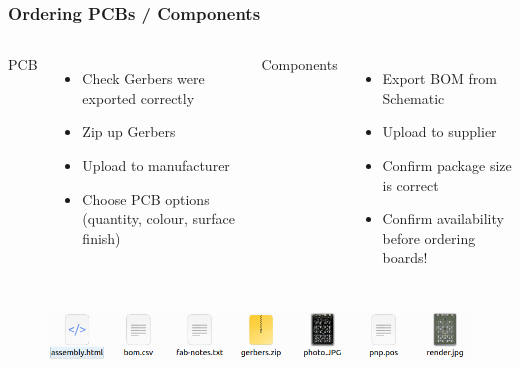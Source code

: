 \documentclass[aspectratio=169, t]{beamer}
\begin{document}
\begin{frame}
\frametitle{Ordering PCBs / Components}
\begin{columns}
	PCB
	\begin{itemize}
		\item Check Gerbers were exported correctly
		\item Zip up Gerbers
		\item Upload to manufacturer
		\item Choose PCB options (quantity, colour, surface finish)
	\end{itemize}
	
	Components
	\begin{itemize}
		\item Export BOM from Schematic
		\item Upload to supplier
		\item Confirm package size is correct
		\item Confirm availability before ordering boards!
	\end{itemize}
	
\end{columns}
\vspace{5mm}
\begin{figure}
	\includegraphics[width=\linewidth]{images/exported-files.png}
\end{figure}
\end{frame}
\end{document}
